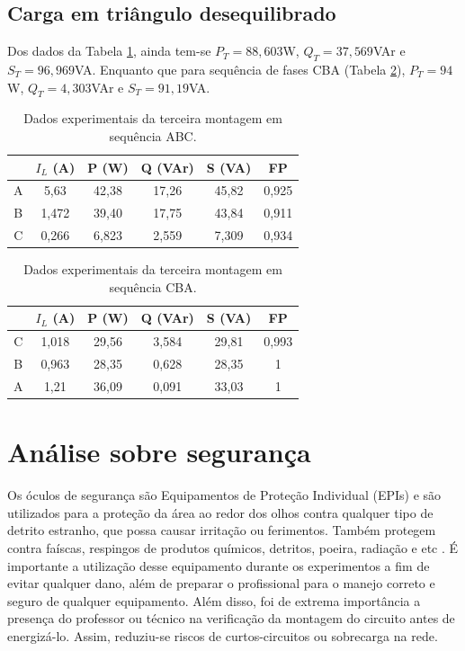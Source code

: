 \documentclass[a4paper,12pt,oneside,openany,table,xcdraw]{article}
\begin{document}
\subsection{Carga em triângulo desequilibrado} \label{m3:dados}
Dos dados da Tabela \ref{m3:dados:abc}, ainda tem-se $P_T = 88,603$W, $Q_T = 37,569$VAr e $S_T = 96,969$VA. Enquanto que para sequência de fases CBA (Tabela \ref{m3:dados:cba}), $P_T = 94$W, $Q_T = 4,303$VAr e $S_T = 91,19$VA.

\begin{table}[H]
\centering \small {}
\caption{Dados experimentais da terceira montagem em sequência ABC.}
\label{m3:dados:abc}
\begin{tabular}{c|c|c|c|c|c|}
\cline{2-6}
                        & $I_L$ (A) & P (W) & Q (VAr) & S (VA) & FP    \\ \hline
\multicolumn{1}{|c|}{A} & 5,63      & 42,38 & 17,26   & 45,82  & 0,925 \\ \hline
\multicolumn{1}{|c|}{B} & 1,472     & 39,40 & 17,75   & 43,84  & 0,911 \\ \hline
\multicolumn{1}{|c|}{C} & 0,266     & 6,823 & 2,559   & 7,309  & 0,934 \\ \hline
\end{tabular}
\end{table}

\begin{table}[H]
\centering \small {}
\caption{Dados experimentais da terceira montagem em sequência CBA.}
\label{m3:dados:cba}
\begin{tabular}{c|c|c|c|c|c|}
\cline{2-6}
 & $I_L$ (A) & P (W) & Q (VAr) & S (VA) & FP \\ \hline
\multicolumn{1}{|c|}{C} & 1,018 & 29,56 & 3,584 & 29,81 & 0,993 \\ \hline
\multicolumn{1}{|c|}{B} & 0,963 & 28,35 & 0,628 & 28,35 & 1 \\ \hline
\multicolumn{1}{|c|}{A} & 1,21 & 36,09 & 0,091 & 33,03 & 1 \\ \hline
\end{tabular}
\end{table}


\section{Análise sobre segurança} %
Os óculos de segurança são Equipamentos de Proteção Individual (EPIs) e são utilizados para a proteção da área ao redor dos olhos contra qualquer tipo de detrito estranho, que possa causar irritação ou ferimentos. Também protegem contra faíscas, respingos de produtos químicos, detritos, poeira, radiação e etc \cite{safe}.
É importante a utilização desse equipamento durante os experimentos a fim de evitar qualquer dano, além de preparar o profissional para o manejo correto e seguro de qualquer equipamento.
Além disso, foi de extrema importância a presença do professor ou técnico na verificação da montagem do circuito antes de energizá-lo. Assim, reduziu-se riscos de curtos-circuitos ou sobrecarga na rede.
\end{document}
